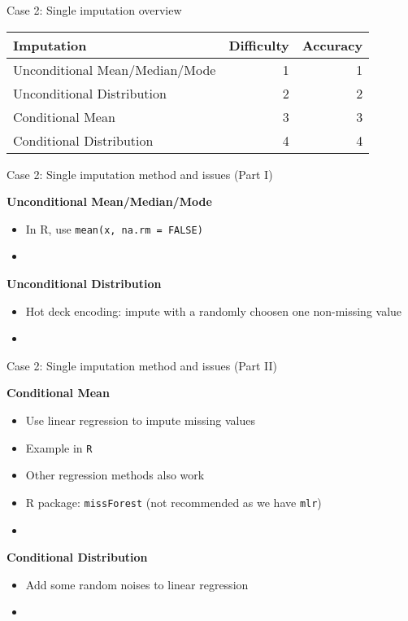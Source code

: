 \documentclass[ignorenonframetext,]{beamer}
\providecommand{\tightlist}{%
  \setlength{\itemsep}{0pt}\setlength{\parskip}{0pt}}
\begin{document}
\begin{frame}{Case 2: Single imputation overview}

\begin{longtable}[]{@{}lrr@{}}
\toprule
Imputation & Difficulty & Accuracy\tabularnewline
\midrule
\endhead
Unconditional Mean/Median/Mode & 1 & 1\tabularnewline
Unconditional Distribution & 2 & 2\tabularnewline
Conditional Mean & 3 & 3\tabularnewline
Conditional Distribution & 4 & 4\tabularnewline
\bottomrule
\end{longtable}

\end{frame}

\begin{frame}[fragile]{Case 2: Single imputation method and issues (Part
I)}

\textbf{Unconditional Mean/Median/Mode}

\begin{itemize}
\tightlist
\item
  In R, use \texttt{mean(x,\ na.rm\ =\ FALSE)}
\item
  \color{red}{Issue: Zero variance in imputed values}
\end{itemize}

\textbf{Unconditional Distribution}

\begin{itemize}
\tightlist
\item
  Hot deck encoding: impute with a randomly choosen one non-missing
  value
\item
  \color{red}{Issue: less biased variance in imputed values, wrong correlation}
\end{itemize}

\end{frame}

\begin{frame}[fragile]{Case 2: Single imputation method and issues (Part
II)}

\textbf{Conditional Mean}

\begin{itemize}
\item
  Use linear regression to impute missing values
\item
  Example in \texttt{R}
\item
  Other regression methods also work
\item
  R package: \texttt{missForest} (not recommended as we have
  \texttt{mlr})
\item
  \color{red}{Issue: wrong conditional variance}
\end{itemize}

\textbf{Conditional Distribution}

\begin{itemize}
\tightlist
\item
  Add some random noises to linear regression
\item
  \color{red}{How to generate random noises}
\end{itemize}

\end{frame}
\end{document}
